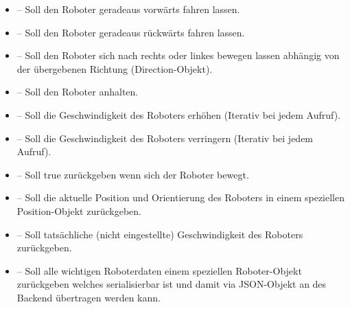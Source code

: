 \begin{itemize}
	\item{} -- Soll den Roboter geradeaus vorwärts fahren lassen.
	\item{} -- Soll den Roboter geradeaus rückwärts fahren lassen.
	\item{} -- Soll den Roboter sich nach rechts oder linkes bewegen lassen abhängig von der übergebenen Richtung
	(Direction-Objekt).
	\item{} -- Soll den Roboter anhalten.
	\item{} -- Soll die Geschwindigkeit des Roboters erhöhen (Iterativ bei jedem Aufruf).
	\item{} -- Soll die Geschwindigkeit des Roboters verringern (Iterativ bei jedem Aufruf).
	\item{} -- Soll true zurückgeben wenn sich der Roboter bewegt.
	\item{} -- Soll die aktuelle Position und Orientierung des Roboters in einem speziellen 
	Position-Objekt zurückgeben.
	\item{} -- Soll tatsächliche (nicht eingestellte) Geschwindigkeit des Roboters zurückgeben.
	\item{} -- Soll alle wichtigen Roboterdaten einem speziellen Roboter-Objekt zurückgeben welches 
	serialisierbar ist und damit via JSON-Objekt an des Backend übertragen werden kann.
\end{itemize}

